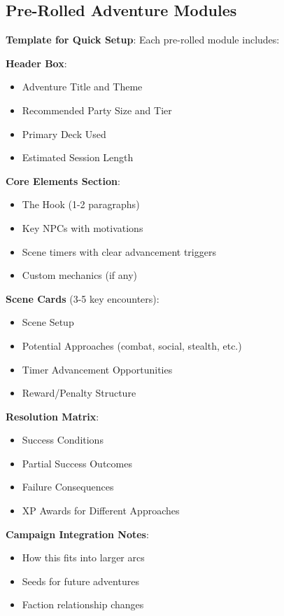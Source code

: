 \documentclass[11pt]{article}
\begin{document}
\subsection*{Pre-Rolled Adventure Modules}

\begin{mdframed}[backgroundcolor=modulebg]
\textbf{Template for Quick Setup}: Each pre-rolled module includes:

\textbf{Header Box}:
\begin{itemize}[leftmargin=*]
\item Adventure Title and Theme
\item Recommended Party Size and Tier
\item Primary Deck Used
\item Estimated Session Length
\end{itemize}

\textbf{Core Elements Section}:
\begin{itemize}[leftmargin=*]
\item The Hook (1-2 paragraphs)
\item Key NPCs with motivations
\item Scene timers with clear advancement triggers
\item Custom mechanics (if any)
\end{itemize}

\textbf{Scene Cards} (3-5 key encounters):
\begin{itemize}[leftmargin=*]
\item Scene Setup
\item Potential Approaches (combat, social, stealth, etc.)
\item Timer Advancement Opportunities
\item Reward/Penalty Structure
\end{itemize}

\textbf{Resolution Matrix}:
\begin{itemize}[leftmargin=*]
\item Success Conditions
\item Partial Success Outcomes
\item Failure Consequences
\item XP Awards for Different Approaches
\end{itemize}

\textbf{Campaign Integration Notes}:
\begin{itemize}[leftmargin=*]
\item How this fits into larger arcs
\item Seeds for future adventures
\item Faction relationship changes
\end{itemize}
\end{mdframed}
\end{document}
